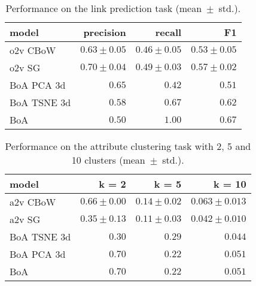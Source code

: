 \begin{table}[t]
\caption{Performance on the link prediction task (mean~$\pm$~std.).}\label{tab:object}
\centering
\begin{tabular}{lrrr}
\toprule
model &  precision & recall & F1 \\
\midrule
o2v CBoW    &  $0.63 \pm 0.05$ & $0.46 \pm 0.05$ & $0.53 \pm 0.05$ \\
o2v SG      &  $0.70 \pm 0.04$ & $0.49 \pm 0.03$ & $0.57 \pm 0.02$ \\
\midrule
BoA PCA 3d  &  $0.65$ & $0.42$ & $0.51$ \\
BoA TSNE 3d &  $0.58$ & $0.67$ & $\mathbf{0.62}$ \\
BoA         &  $0.50$ & $1.00$ & $\mathbf{0.67}$ \\
\bottomrule
\end{tabular}
\end{table}

\begin{table}[t]
\caption{Performance on the attribute clustering task with 2, 5 and 10 clusters (mean~$\pm$~std.).}\label{tab:attribute}
\centering
\begin{tabular}{lrrr}
\toprule
model              & k = 2 & k = 5 & k = 10 \\
\midrule
a2v CBoW           & $0.66 \pm 0.00$ &  $0.14 \pm 0.02$ & $\mathbf{0.063 \pm 0.013}$ \\
a2v SG             & $0.35 \pm 0.13$ &  $0.11 \pm 0.03$ & $0.042 \pm 0.010$ \\
\midrule
BoA TSNE 3d & $0.30$ & $0.29$ & $0.044$ \\
BoA PCA 3d  & $\mathbf{0.70}$ & $\mathbf{0.22}$ & $0.051$ \\
BoA         & $\mathbf{0.70}$ & $\mathbf{0.22}$ & $0.051$ \\
\bottomrule
\end{tabular}
\end{table}


